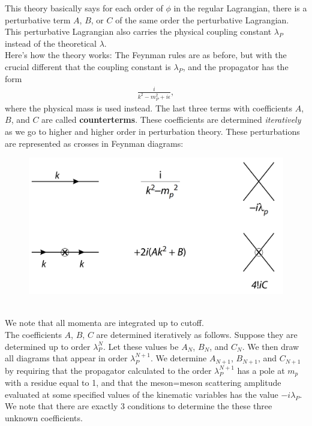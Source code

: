 \documentclass{book}
\theoremstyle{definition}
\newcommand{\f}[2]{\frac{#1}{#2}}
\begin{document}
This theory basically says for each order of $\phi$ in the regular Lagrangian, there is a perturbative term $A$, $B$, or $C$ of the same order the perturbative Lagrangian. This perturbative Lagrangian also carries the physical coupling constant $\lambda_P$ instead of the theoretical $\lambda$. \\



Here's how the theory works: The Feynman rules are as before, but with the crucial different that  the coupling constant is $\lambda_P$, and the propagator has the form
\begin{align}
\f{i}{k^2 - m_P^2 + i\epsilon},
\end{align}
where the physical mass is used instead. The last three terms with coefficients $A$, $B$, and $C$ are called \textbf{counterterms}. These coefficients are determined \textit{iteratively} as we go to higher and higher order in perturbation theory. These perturbations are represented as crosses in Feynman diagrams:
\begin{figure}[!htb]
	\centering
	\includegraphics[scale=0.2]{crosses}
\end{figure}\\

We note that all momenta are integrated up to cutoff. \\

The coefficients $A$, $B$, $C$ are determined iteratively as follows. Suppose they are determined up to order $\lambda_P^N$. Let these values be $A_N$, $B_N$, and $C_N$. We then draw all diagrams that appear in order $\lambda_P^{N+1}$. We determine $A_{N+1}$, $B_{N+1}$, and $C_{N+1}$ by requiring that the propagator calculated to the order $\lambda^{N+1}_{P}$ has a pole at $m_p$ with a residue equal to 1, and that the meson=meson scattering amplitude evaluated at some specified values of the kinematic variables has the value $-i\lambda_P$. We note that there are exactly 3 conditions to determine the these three unknown coefficients.
\end{document}
